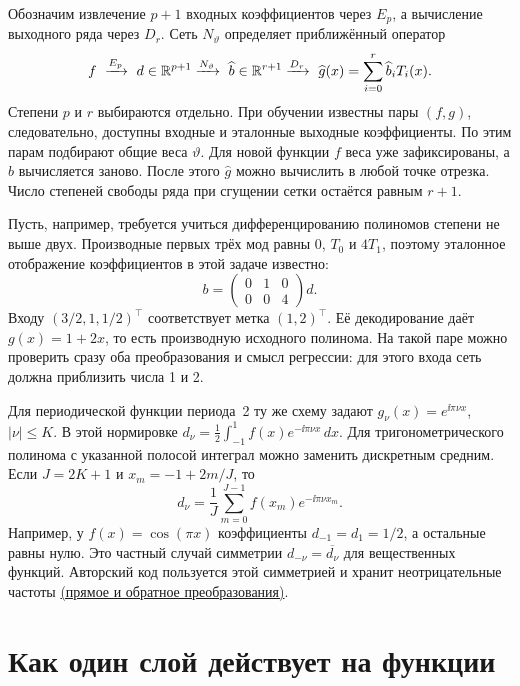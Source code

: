 Обозначим извлечение $p+1$ входных коэффициентов через $E_p$, а
вычисление выходного ряда через $D_r$. Сеть $N_\vartheta$
определяет приближённый оператор
\begin{equation}
 f\ \xrightarrow{E_p}\ d\in\R^{p+1} \xrightarrow{N_\vartheta}\ \widehat b\in\R^{r+1} \xrightarrow{D_r}\ \widehat g(x)=\sum_{i=0}^{r}\widehat b_i T_i(x).
 \label{sno:operator-factorization}
\end{equation}
Степени $p$ и $r$ выбираются отдельно. При обучении известны пары
$(f,g)$, следовательно, доступны входные и эталонные выходные
коэффициенты. По этим парам подбирают общие веса $\vartheta$.
Для новой функции $f$ веса уже зафиксированы, а $\widehat b$
вычисляется заново. После этого $\widehat g$ можно вычислить в любой
точке отрезка. Число степеней свободы ряда при сгущении сетки остаётся
равным $r+1$.

Пусть, например, требуется учиться дифференцированию полиномов степени
не выше двух. Производные первых трёх мод равны $0$, $T_0$ и $4T_1$,
поэтому эталонное отображение коэффициентов в этой задаче известно:
\[
 b=\begin{pmatrix}0&1&0\\0&0&4\end{pmatrix}d .
\]
Входу $(3/2,1,1/2)^\top$ соответствует метка $(1,2)^\top$.
Её декодирование даёт $g(x)=1+2x$, то есть производную исходного
полинома. На такой паре можно проверить сразу оба преобразования
и смысл регрессии: для этого входа сеть должна приблизить числа 1 и 2.

Для периодической функции периода~2 ту же схему задают
$g_\nu(x)=e^{\ii\pi\nu x}$, $|\nu|\le K$. В этой нормировке
$d_\nu=\tfrac12\int_{-1}^1f(x)e^{-\ii\pi\nu x}\,dx$.
Для тригонометрического полинома с указанной полосой интеграл можно
заменить дискретным средним. Если $J=2K+1$ и $x_m=-1+2m/J$, то
\[
 d_\nu=\frac1J\sum_{m=0}^{J-1}f(x_m)e^{-\ii\pi\nu x_m}.
\]
Например, у $f(x)=\cos(\pi x)$ коэффициенты $d_{-1}=d_1=1/2$,
а остальные равны нулю. Это частный случай симметрии
$d_{-\nu}=\overline{d_\nu}$ для вещественных функций. Авторский код
пользуется этой симметрией и хранит неотрицательные частоты
\href{https://github.com/VLSF/SNO/blob/4362226284f22f6f456d429ec4ddec5b8596e894/functions/Fourier.py\#L43-L56}{(прямое и обратное преобразования)}.

\section{Как один слой действует на функции}
\label{sno:mixed-layer}

